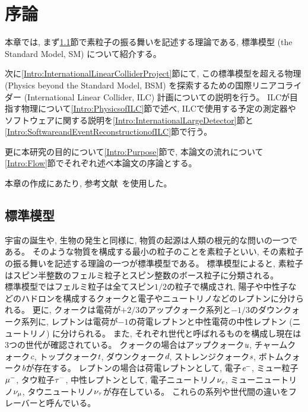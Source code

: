 
\chapter{序論} \label{chap:Introduction}

本章では, まず\ref{Intro:StandardModel}節で素粒子の振る舞いを記述する理論である, 標準模型 (the Standard Model, SM) について紹介する。

次に\ref{Intro:InternationalLinearColliderProject}節にて, この標準模型を超える物理 (Physics beyond the Standard Model, BSM) を探索するための国際リニアコライダー (International Linear Collider, ILC) 計画についての説明を行う。
ILCが目指す物理について\ref{Intro:PhysicsofILC}節で述べ, ILCで使用する予定の測定器やソフトウェアに関する説明を\ref{Intro:InternationalLargeDetector}節と\ref{Intro:SoftwareandEventReconstructionofILC}節で行う。

更に本研究の目的について\ref{Intro:Purpose}節で, 本論文の流れについて\ref{Intro:Flow}節でそれぞれ述べ本論文の序論とする。

本章の作成にあたり, 参考文献~\cite{GlobalProject, InterimDesignReport}を使用した。


\section{標準模型} \label{Intro:StandardModel}

宇宙の誕生や, 生物の発生と同様に, 物質の起源は人類の根元的な問いの一つである。
そのような物質を構成する最小の粒子のことを素粒子といい, その素粒子の振る舞いを記述する理論の一つが標準模型である。
標準模型によると, 素粒子はスピン半整数のフェルミ粒子とスピン整数のボース粒子に分類される。\\

標準模型ではフェルミ粒子は全てスピン$1/2$の粒子で構成され, 陽子や中性子などのハドロンを構成するクォークと電子やニュートリノなどのレプトンに分けられる。
更に, クォークは電荷が$+2/3$のアップクォーク系列と$-1/3$のダウンクォーク系列に, レプトンは電荷が$-1$の荷電レプトンと中性電荷の中性レプトン (ニュートリノ) に分けられる。
また, それぞれ世代と呼ばれるものを構成し現在は3つの世代が確認されている。
クォークの場合はアップクォーク$\textit u$, チャームクォーク$\textit c$, トップクォーク$\textit t$, ダウンクォーク$\textit d$, ストレンジクォーク$\textit s$, ボトムクォーク$\textit b$が存在する。
レプトンの場合は荷電レプトンとして, 電子$\textit e^-$, ミュー粒子$\it \mu^-$, タウ粒子$\it \tau^-$, 中性レプトンとして, 電子ニュートリノ$\it \nu_e$, ミューニュートリノ$\it \nu_{\mu}$, タウニュートリノ$\it \nu_{\tau}$が存在している。
これらの系列や世代間の違いをフレーバーと呼んでいる。


